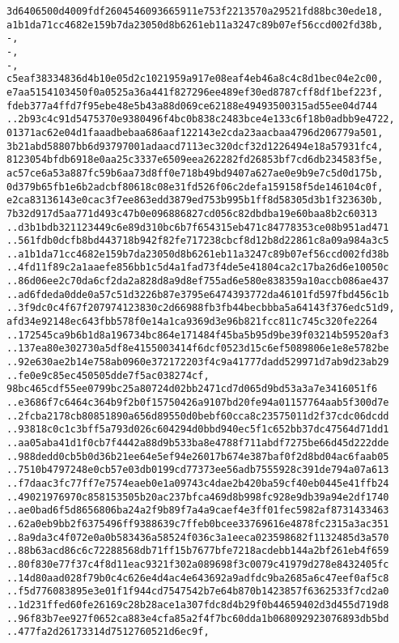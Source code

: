 \documentclass[
]{article}
\begin{document}
\begin{verbatim}
3d6406500d4009fdf2604546093665911e753f2213570a29521fd88bc30ede18,
a1b1da71cc4682e159b7da23050d8b6261eb11a3247c89b07ef56ccd002fd38b,
-,
-,
-,
c5eaf38334836d4b10e05d2c1021959a917e08eaf4eb46a8c4c8d1bec04e2c00,
e7aa5154103450f0a0525a36a441f827296ee489ef30ed8787cff8df1bef223f,
fdeb377a4ffd7f95ebe48e5b43a88d069ce62188e49493500315ad55ee04d744
..2b93c4c91d5475370e9380496f4bc0b838c2483bce4e133c6f18b0adbb9e4722,
01371ac62e04d1faaadbebaa686aaf122143e2cda23aacbaa4796d206779a501,
3b21abd58807bb6d93797001adaacd7113ec320dcf32d1226494e18a57931fc4,
8123054bfdb6918e0aa25c3337e6509eea262282fd26853bf7cd6db234583f5e,
ac57ce6a53a887fc59b6aa73d8ff0e718b49bd9407a627ae0e9b9e7c5d0d175b,
0d379b65fb1e6b2adcbf80618c08e31fd526f06c2defa159158f5de146104c0f,
e2ca83136143e0cac3f7ee863edd3879ed753b995b1ff8d58305d3b1f323630b,
7b32d917d5aa771d493c47b0e096886827cd056c82dbdba19e60baa8b2c60313
..d3b1bdb321123449c6e89d310bc6b7f654315eb471c84778353ce08b951ad471
..561fdb0dcfb8bd443718b942f82fe717238cbcf8d12b8d22861c8a09a984a3c5
..a1b1da71cc4682e159b7da23050d8b6261eb11a3247c89b07ef56ccd002fd38b
..4fd11f89c2a1aaefe856bb1c5d4a1fad73f4de5e41804ca2c17ba26d6e10050c
..86d06ee2c70da6cf2da2a828d8a9d8ef755ad6e580e838359a10accb086ae437
..ad6fdeda0dde0a57c51d3226b87e3795e6474393772da46101fd597fbd456c1b
..3f9dc0c4f67f207974123830c2d66988fb3fb44becbbba5a64143f376edc51d9,
afd34e92148ec643fbb578f0e14a1ca9369d3e96b821fcc811c745c320fe2264
..172545ca9b6b1d8a196734bc864e171484f45ba5b95d9be39f03214b59520af3
..137ea80e302730a5df8e4155003414f6dcf0523d15c6ef5089806e1e8e5782be
..92e630ae2b14e758ab0960e372172203f4c9a41777dadd529971d7ab9d23ab29
..fe0e9c85ec450505dde7f5ac038274cf,
98bc465cdf55ee0799bc25a80724d02bb2471cd7d065d9bd53a3a7e3416051f6
..e3686f7c6464c364b9f2b0f15750426a9107bd20fe94a01157764aab5f300d7e
..2fcba2178cb80851890a656d89550d0bebf60cca8c23575011d2f37cdc06dcdd
..93818c0c1c3bff5a793d026c604294d0bbd940ec5f1c652bb37dc47564d71dd1
..aa05aba41d1f0cb7f4442a88d9b533ba8e4788f711abdf7275be66d45d222dde
..988dedd0cb5b0d36b21ee64e5ef94e26017b674e387baf0f2d8bd04ac6faab05
..7510b4797248e0cb57e03db0199cd77373ee56adb7555928c391de794a07a613
..f7daac3fc77ff7e7574eaeb0e1a09743c4dae2b420ba59cf40eb0445e41ffb24
..49021976970c858153505b20ac237bfca469d8b998fc928e9db39a94e2df1740
..ae0bad6f5d8656806ba24a2f9b89f7a4a9caef4e3ff01fec5982af8731433463
..62a0eb9bb2f6375496ff9388639c7ffeb0bcee33769616e4878fc2315a3ac351
..8a9da3c4f072e0a0b583436a58524f036c3a1eeca023598682f1132485d3a570
..88b63acd86c6c72288568db71ff15b7677bfe7218acdebb144a2bf261eb4f659
..80f830e77f37c4f8d11eac9321f302a089698f3c0079c41979d278e8432405fc
..14d80aad028f79b0c4c626e4d4ac4e643692a9adfdc9ba2685a6c47eef0af5c8
..f5d776083895e3e01f1f944cd7547542b7e64b870b1423857f6362533f7cd2a0
..1d231ffed60fe26169c28b28ace1a307fdc8d4b29f0b44659402d3d455d719d8
..96f83b7ee927f0652ca883e4cfa85a2f4f7bc60dda1b068092923076893db5bd
..477fa2d26173314d7512760521d6ec9f,
\end{verbatim}
\end{document}
